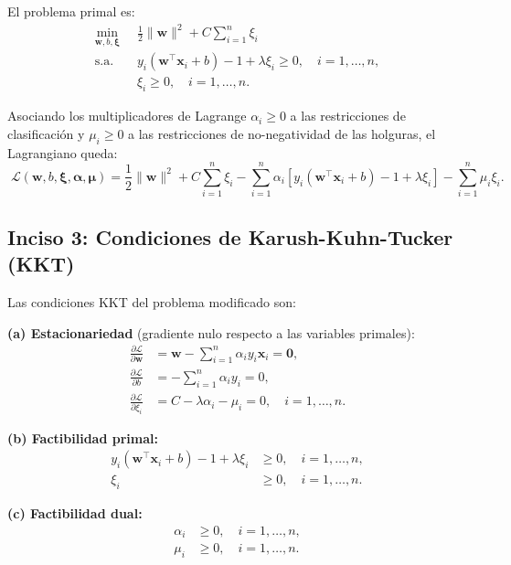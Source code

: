 \documentclass[spanish]{article}
\begin{document}
El problema primal es:
\begin{align*}
\min_{\mathbf{w}, b, \boldsymbol{\xi}}\;\;& \frac{1}{2}\|\mathbf{w}\|^2 + C\sum_{i=1}^{n}\xi_i\\
\text{s.a. }\;\;& y_i(\mathbf{w}^\top \mathbf{x}_i + b) - 1 + \lambda \xi_i \geq 0, \quad i=1,\dots,n,\\
& \xi_i \geq 0, \quad i=1,\dots,n.
\end{align*}

Asociando los multiplicadores de Lagrange $\alpha_i \geq 0$ a las restricciones de clasificación y $\mu_i \geq 0$ a las restricciones de no-negatividad de las holguras, el Lagrangiano queda:
\begin{equation}
\boxed{\;
\mathcal{L}(\mathbf{w}, b, \boldsymbol{\xi}, \boldsymbol{\alpha}, \boldsymbol{\mu}) = 
\frac{1}{2}\|\mathbf{w}\|^2 + C\sum_{i=1}^{n}\xi_i 
- \sum_{i=1}^{n}\alpha_i\!\left[y_i(\mathbf{w}^\top \mathbf{x}_i + b) - 1 + \lambda \xi_i\right] 
- \sum_{i=1}^{n}\mu_i \xi_i.
\;}
\end{equation}

\subsection{Inciso 3: Condiciones de Karush-Kuhn-Tucker (KKT)}

Las condiciones KKT del problema modificado son:

\textbf{(a) Estacionariedad} (gradiente nulo respecto a las variables primales):
\begin{align}
\frac{\partial \mathcal{L}}{\partial \mathbf{w}} &= \mathbf{w} - \sum_{i=1}^{n}\alpha_i y_i \mathbf{x}_i = \mathbf{0},\\
\frac{\partial \mathcal{L}}{\partial b} &= -\sum_{i=1}^{n}\alpha_i y_i = 0,\\
\frac{\partial \mathcal{L}}{\partial \xi_i} &= C - \lambda\alpha_i - \mu_i = 0, \quad i=1,\dots,n.
\end{align}

\textbf{(b) Factibilidad primal:}
\begin{align}
y_i(\mathbf{w}^\top \mathbf{x}_i + b) - 1 + \lambda \xi_i &\geq 0, \quad i=1,\dots,n,\\
\xi_i &\geq 0, \quad i=1,\dots,n.
\end{align}

\textbf{(c) Factibilidad dual:}
\begin{align}
\alpha_i &\geq 0, \quad i=1,\dots,n,\\
\mu_i &\geq 0, \quad i=1,\dots,n.
\end{align}
\end{document}
